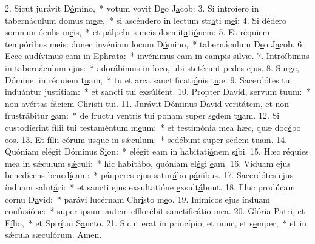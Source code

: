 2. Sicut jurávit D\uline{ó}mino,~* votum vovit D\uline{e}o J\uline{a}cob:
3. Si introíero in tabernáculum domus m\uline{e}æ,~* si ascéndero in lectum str\uline{a}ti m\uline{e}i:
4. Si dédero somnum óculis m\uline{e}is,~* et pálpebris meis dormit\uline{a}ti\uline{ó}nem:
5. Et réquiem tempóribus meis: donec invéniam locum D\uline{ó}mino,~* tabernáculum D\uline{e}o J\uline{a}cob.
6. Ecce audívimus eam in \uline{E}phrata:~* invénimus eam in c\uline{a}mpis s\uline{i}lvæ.
7. Introíbimus in tabernáculum \uline{e}jus:~* adorábimus in loco, ubi stetérunt p\uline{e}des \uline{e}jus.
8. Surge, Dómine, in réquiem t\uline{u}am,~* tu et arca sanctificati\uline{ó}nis t\uline{u}æ.
9. Sacerdótes tui induántur just\uline{í}tiam:~* et sancti t\uline{u}i exs\uline{ú}ltent.
10. Propter David, servum t\uline{u}um:~* non avértas fáciem Chr\uline{i}sti t\uline{u}i.
11. Jurávit Dóminus David veritátem, et non frustrábitur \uline{e}am:~* de fructu ventris tui ponam super s\uline{e}dem t\uline{u}am.
12. Si custodíerint fílii tui testaméntum m\uline{e}um:~* et testimónia mea hæc, quæ doc\uline{é}bo \uline{e}os.
13. Et fílii eórum usque in s\uline{ǽ}culum:~* sedébunt super s\uline{e}dem t\uline{u}am.
14. Quóniam elégit Dóminus S\uline{i}on:~* elégit eam in habitati\uline{ó}nem s\uline{i}bi.
15. Hæc réquies mea in sǽculum s\uline{ǽ}culi:~* hic habitábo, quóniam el\uline{é}gi \uline{e}am.
16. Víduam ejus benedícens bened\uline{í}cam:~* páuperes ejus satur\uline{á}bo p\uline{á}nibus.
17. Sacerdótes ejus índuam salut\uline{á}ri:~* et sancti ejus exsultatióne \uline{e}xsult\uline{á}bunt.
18. Illuc prodúcam cornu D\uline{a}vid:~* parávi lucérnam Chr\uline{i}sto m\uline{e}o.
19. Inimícos ejus índuam confusi\uline{ó}ne:~* super ipsum autem efflorébit sanctific\uline{á}tio m\uline{e}a.
20. Glória Patri, et F\uline{í}lio,~* et Spir\uline{í}tui S\uline{a}ncto.
21. Sicut erat in princípio, et nunc, et s\uline{e}mper,~* et in sǽcula sæcul\uline{ó}rum. \uline{A}men.
